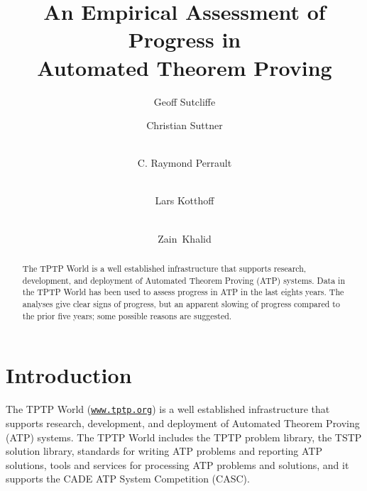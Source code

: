 \documentclass[runningheads]{llncs}
\begin{document}
\title{An Empirical Assessment of Progress in \\ Automated Theorem Proving}

\author{
Geoff Sutcliffe
\and
Christian Suttner
\and \\
C. Raymond Perrault
\and \\
Lars Kotthoff
\and \\
Zain~Khalid
}

\maketitle
\begin{abstract}
The TPTP World is a well established infrastructure that supports research, development, and 
deployment of Automated Theorem Proving (ATP) systems.
Data in the TPTP World has been used to assess progress in ATP in the last eights years.
The analyses give clear signs of progress, but an apparent slowing of progress compared to the
prior five years; some possible reasons are suggested.

\end{abstract}
\section{Introduction}
\label{Introduction}

The TPTP World \cite{Sut17} (\href{https://www.tptp.org}{\tt www.tptp.org}) is a well established 
infrastructure that supports research, development, and deployment of Automated Theorem Proving 
(ATP) systems.
The TPTP World includes the TPTP problem library,
the TSTP solution library,
standards for writing ATP problems and reporting ATP solutions,
tools and services for processing ATP problems and solutions,
and it supports the CADE ATP System Competition (CASC).
\end{document}
